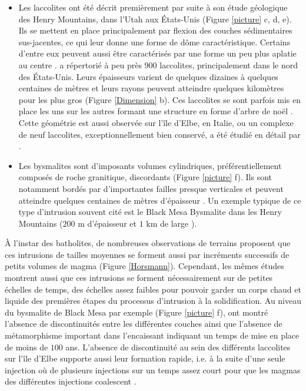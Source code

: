 \begin{itemize}
\item    Les   laccolites    ont   été    décrit   premièrement    par
  \citet{Gilbert:1877uk}  suite  à  son  étude  géologique  des  Henry
  Mountains, dans  l'Utah aux  États-Unis (Figure \ref{picture}  c, d,
  e).  Ils se mettent en  place principalement par flexion des couches
  sédimentaires  sus-jacentes, ce  qui leur  donne une  forme de  dôme
  caractéristique.    Certains   d'entre   eux  peuvent   aussi   être
  caractérisés  par   une  forme  un   peu  plus  aplatie   au  centre
  \citep{Koch:1981if}. \citet{E:2015tl} a répertorié  à peu près $900$
  laccolites,  principalement  dans  le nord  des  États-Unis.   Leurs
  épaisseurs  varient de  quelques  dizaines à  quelques centaines  de
  mètres et  leurs rayons  peuvent atteindre quelques  kilomètres pour
  les plus  gros (Figure \ref{Dimension}  b).  Ces laccolites  se sont
  parfois mis en place les uns sur les autres formant une structure en
  forme d'arbre  de noël \citep{E:2015tl}.  Cette  géométrie est aussi
  observée  sur  l'île d'Elbe,  en  Italie,  ou  un complexe  de  neuf
  laccolites, exceptionnellement bien conservé, a été étudié en détail
  par \citet{Rocchi:2002jy}.

\item   Les   bysmalites   sont  d'imposants   volumes   cylindriques,
  préférentiellement composés de roche granitique, discordants (Figure
  \ref{picture}  f).   Ils  sont notamment  bordés  par  d'importantes
  failles presque  verticales et peuvent atteindre  quelques centaines
  de mètres d'épaisseur \citep{Johnson:1973ho}.  Un exemple typique de
  ce type  d'intrusion souvent cité  est le Black Mesa  Bysmalite dans
  les  Henry  Mountains  ($200$  m  d'épaisseur et  $1$  km  de  large
  \citep{Morgan:2008hj}).
\end{itemize}

À  l'instar des  batholites,  de nombreuses  observations de  terrains
proposent que ces intrusions de  tailles moyennes se forment aussi par
incréments     successifs    de     petits     volumes    de     magma
\citep{Habert:2004wg,Horsman:2005ct,Morgan:2008hj}             (Figure
\ref{Horsmann}).  Cependant,  les mêmes études montrent  aussi que ces
intrusions se forment nécessairement sur de petites échelles de temps,
des  échelles assez  faibles pour  pouvoir  garder un  corps chaud  et
liquide   des  premières   étapes  du   processus  d'intrusion   à  la
solidification.   Au niveau  du bysmalite  de Black  Mesa par  exemple
(Figure \ref{picture}  f), \citet{Habert:2004wg} ont  montré l'absence
de discontinuités entre les différentes couches ainsi que l'absence de
métamorphisme important  dans l'encaissant indiquant un  temps de mise
en place de moins de $100$ ans. L'absence de discontinuité au sein des
différents laccolites  sur l'île d'Elbe supporte  aussi leur formation
rapide,  i.e.   à la  suite  d'une  seule  injection où  de  plusieurs
injections  sur  un  temps  assez   court  pour  que  les  magmas  des
différentes injections coalescent \citep{Roni:2014gt}.

